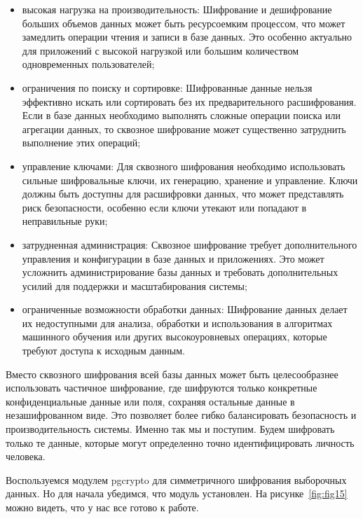 \begin{itemize}
    \item высокая нагрузка на производительность: Шифрование и дешифрование больших объемов данных может быть ресурсоемким процессом, что может замедлить операции чтения и записи в базе данных. Это особенно актуально для приложений с высокой нагрузкой или большим количеством одновременных пользователей;
    \item ограничения по поиску и сортировке: Шифрованные данные нельзя эффективно искать или сортировать без их предварительного расшифрования. Если в базе данных необходимо выполнять сложные операции поиска или агрегации данных, то сквозное шифрование может существенно затруднить выполнение этих операций;
    \item управление ключами: Для сквозного шифрования необходимо использовать сильные шифровальные ключи, их генерацию, хранение и управление. Ключи должны быть доступны для расшифровки данных, что может представлять риск безопасности, особенно если ключи утекают или попадают в неправильные руки;
    \item затрудненная администрация: Сквозное шифрование требует дополнительного управления и конфигурации в базе данных и приложениях. Это может усложнить администрирование базы данных и требовать дополнительных усилий для поддержки и масштабирования системы;
    \item ограниченные возможности обработки данных: Шифрование данных делает их недоступными для анализа, обработки и использования в алгоритмах машинного обучения или других высокоуровневых операциях, которые требуют доступа к исходным данным.
\end{itemize}

Вместо сквозного шифрования всей базы данных может быть целесообразнее использовать частичное шифрование, где шифруются только конкретные конфиденциальные данные или поля, сохраняя остальные данные в незашифрованном виде. Это позволяет более гибко балансировать безопасность и производительность системы. Именно так мы и поступим. Будем шифровать только те данные, которые могут определенно точно идентифицировать личность человека.

Воспользуемся модулем pgcrypto для симметричного шифрования выборочных данных. Но для начала убедимся, что модуль установлен. На рисунке~\ref{fig:fig15} можно видеть, что у нас все готово к работе.

